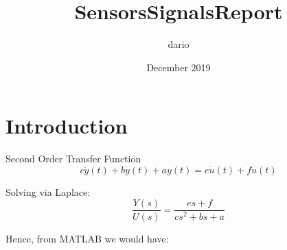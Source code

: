 \documentclass{article}
\title{SensorsSignalsReport}
\author{dario }
\date{December 2019}
\begin{document}
\maketitle

\section{Introduction}

Second Order Transfer Function
\begin{equation}
c\ddot{y}(t) + b\dot{y}(t) + ay(t) = e\dot{u}(t) + fu(t)
\end{equation}

Solving via Laplace:
\begin{equation}
\frac{Y(s)}{U(s)} = \frac{es + f}{cs^2 + bs + a}
\end{equation}

Hence, from MATLAB we would have:
\end{document}
